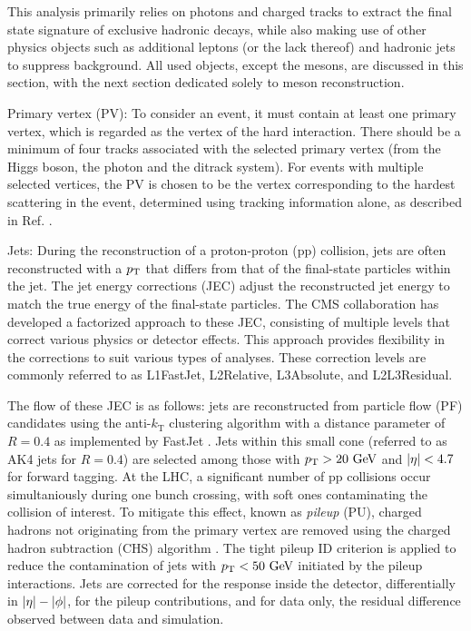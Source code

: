 This analysis primarily relies on photons and charged tracks to extract the final state signature of exclusive hadronic decays, while also making use of other physics objects such as additional leptons (or the lack thereof) and hadronic jets to suppress background. All used objects, except the mesons, are discussed in this section, with the next section dedicated solely to meson reconstruction.
\vspace*{-6pt}
\begin{myitemlist}
    \item[Primary vertex (PV):] To consider an event, it must contain at least one primary vertex, which is regarded as the vertex of the hard interaction. There should be a minimum of four tracks associated with the selected primary vertex (from the Higgs boson, the photon and the ditrack system). For events with multiple selected vertices, the PV is chosen to be the vertex corresponding to the hardest scattering in the event, determined using tracking information alone, as described in Ref. \cite{Contardo:2015bmq}.

    \item[Jets:] During the reconstruction of a proton-proton (pp) collision, jets are often reconstructed with a $p_\text{T}$ that differs from that of the final-state particles within the jet. The jet energy corrections (JEC) adjust the reconstructed jet energy to match the true energy of the final-state particles. The CMS collaboration has developed a factorized approach to these JEC, consisting of multiple levels that correct various physics or detector effects. This approach provides flexibility in the corrections to suit various types of analyses. These correction levels are commonly referred to as L1FastJet, L2Relative, L3Absolute, and L2L3Residual.

    The flow of these JEC is as follows: jets are reconstructed from particle flow (PF) candidates using the anti-$k_\text{T}$ clustering algorithm with a distance parameter of $R = 0.4$ as implemented by FastJet \cite{Cacciari:2011ma}. Jets within this small cone (referred to as AK4 jets for $R = 0.4$) are selected among those with $\pT > 20\ \GeV$ and $\left\lvert\eta\right\rvert < 4.7$ for forward tagging. At the LHC, a significant number of pp collisions occur simultaniously during one bunch crossing, with soft ones contaminating the collision of interest. To mitigate this effect, known as \textit{pileup} (PU), charged hadrons not originating from the primary vertex are removed using the charged hadron subtraction (CHS) algorithm \cite{CMS:2014ata, Perloff:2012wpa}. The tight pileup ID criterion is applied to reduce the contamination of jets with $p_\text{T} < 50\ \text{GeV}$ initiated by the pileup interactions. Jets are corrected for the response inside the detector, differentially in $\left\lvert\eta\right\rvert - \left\lvert\phi\right\rvert$, for the pileup contributions, and for data only, the residual difference observed between data and simulation.
    

\end{myitemlist}
